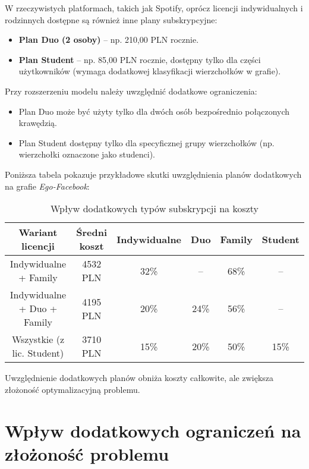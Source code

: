 W rzeczywistych platformach, takich jak Spotify, oprócz licencji indywidualnych i rodzinnych dostępne są również inne plany subskrypcyjne:

\begin{itemize}
    \item \textbf{Plan Duo (2 osoby)} – np. 210,00 PLN rocznie.
    \item \textbf{Plan Student} – np. 85,00 PLN rocznie, dostępny tylko dla części użytkowników (wymaga dodatkowej klasyfikacji wierzchołków w grafie).
\end{itemize}

Przy rozszerzeniu modelu należy uwzględnić dodatkowe ograniczenia:

\begin{itemize}
    \item Plan Duo może być użyty tylko dla dwóch osób bezpośrednio połączonych krawędzią.
    \item Plan Student dostępny tylko dla specyficznej grupy wierzchołków (np. wierzchołki oznaczone jako studenci).
\end{itemize}

Poniższa tabela pokazuje przykładowe skutki uwzględnienia planów dodatkowych na grafie \textit{Ego-Facebook}:

\begin{table}[h]
\centering
\begin{tabular}{|c|c|c|c|c|c|}
\hline
\textbf{Wariant licencji} & \textbf{Średni koszt} & \textbf{Indywidualne} & \textbf{Duo} & \textbf{Family} & \textbf{Student} \\
\hline
Indywidualne + Family & 4532 PLN & 32\% & – & 68\% & – \\
Indywidualne + Duo + Family & 4195 PLN & 20\% & 24\% & 56\% & – \\
Wszystkie (z lic. Student) & 3710 PLN & 15\% & 20\% & 50\% & 15\% \\
\hline
\end{tabular}
\caption{Wpływ dodatkowych typów subskrypcji na koszty}
\label{tab:subscription_plans}
\end{table}

Uwzględnienie dodatkowych planów obniża koszty całkowite, ale zwiększa złożoność optymalizacyjną problemu.

\section{Wpływ dodatkowych ograniczeń na złożoność problemu}

